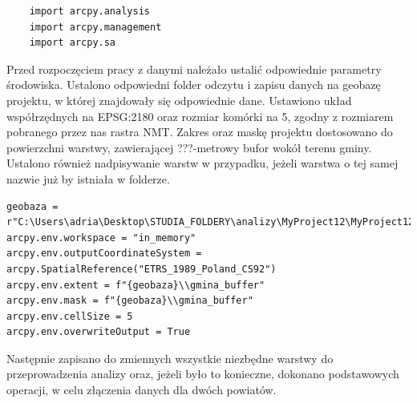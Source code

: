 \documentclass{article}
\begin{document}
\begin{lstlisting}
    import arcpy.analysis
    import arcpy.management
    import arcpy.sa
\end{lstlisting}

Przed rozpoczęciem pracy z danymi należało ustalić odpowiednie parametry środowiska. Ustalono odpowiedni folder odczytu i zapisu danych na geobazę projektu, w której znajdowały się odpowiednie dane. Ustawiono układ współrzędnych na EPSG:2180 oraz rozmiar komórki na 5, zgodny z rozmiarem pobranego przez nas rastra NMT. Zakres oraz maskę projektu dostosowano do powierzchni warstwy, zawierającej ???-metrowy bufor wokół terenu gminy. Ustalono również nadpisywanie warstw w przypadku, jeżeli warstwa o tej samej nazwie już by istniała w folderze.

\begin{lstlisting}
geobaza = r"C:\Users\adria\Desktop\STUDIA_FOLDERY\analizy\MyProject12\MyProject12.gdb"
arcpy.env.workspace = "in_memory"
arcpy.env.outputCoordinateSystem = arcpy.SpatialReference("ETRS_1989_Poland_CS92")
arcpy.env.extent = f"{geobaza}\\gmina_buffer"
arcpy.env.mask = f"{geobaza}\\gmina_buffer"
arcpy.env.cellSize = 5
arcpy.env.overwriteOutput = True
\end{lstlisting}

Następnie zapisano do zmiennych wszystkie niezbędne warstwy do przeprowadzenia analizy oraz, jeżeli było to konieczne, dokonano podstawowych operacji, w celu złączenia danych dla dwóch powiatów.
\end{document}
